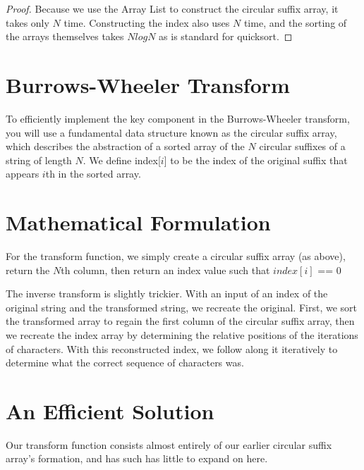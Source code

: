 \documentclass[12pt]{article}
\begin{document}
\begin{proof}
Because we use the Array List to construct the circular suffix array, it takes only $N$ time. Constructing the index also uses $N$ time, and the sorting of the arrays themselves takes $NlogN$ as is standard for quicksort.
\end{proof}




\section{Burrows-Wheeler Transform}
 To efficiently implement the key component in the Burrows-Wheeler transform, you will use a fundamental data structure known as the circular suffix array, which describes the abstraction of a sorted array of the $N$ circular suffixes of a string of length $N$. We define index[$i$] to be the index of the original suffix that appears $i$th in the sorted array.
 
 


\section{Mathematical Formulation}
For the transform function, we simply create a circular suffix array (as above), return the $N$th column, then return an index value such that $index[i]$ == $0$

The inverse transform is slightly trickier. With an input of an index of the original string and the transformed string, we recreate the original. First, we sort the transformed array to regain the first column of the circular suffix array, then we recreate the index array by determining the relative positions of the iterations of characters. With this reconstructed index, we follow along it iteratively to determine what the correct sequence of characters was.

\section{An Efficient Solution}

Our transform function consists almost entirely of our earlier circular suffix array's formation, and has such has little to expand on here.
\end{document}
